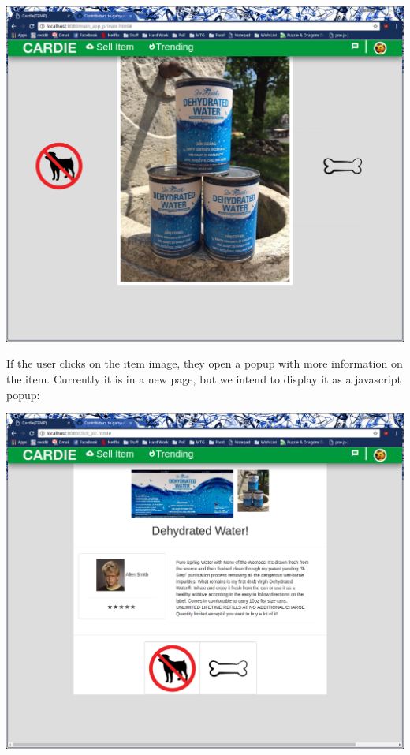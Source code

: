 \documentclass[10pt, titlepage]{article}
\begin{document}
\centerline{\includegraphics[scale=.4]{screen_01}}

\pagebreak

\noindent If the user clicks on the item image, they open a popup with more information on the item. Currently it is in a new page, but we intend to display it as a javascript popup: \\

\centerline{\includegraphics[scale=.4]{screen_03}}

\pagebreak
\end{document}
